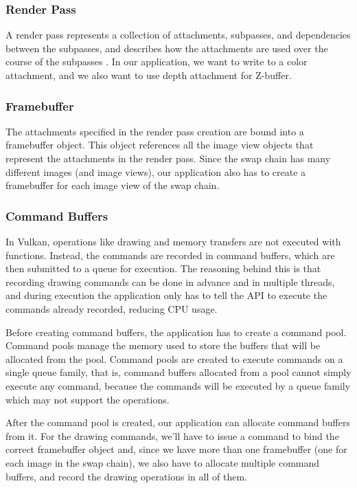\subsubsection{Render Pass}
A render pass represents a collection of attachments, subpasses, and dependencies between the subpasses, and describes how the attachments are used over the course of the subpasses \cite{vulkan_docs}. In our application, we want to write to a color attachment, and we also want to use depth attachment for Z-buffer.

\subsubsection{Framebuffer}
The attachments specified in the render pass creation are bound into a framebuffer object. This object references all the image view objects that represent the attachments in the render pass. Since the swap chain has many different images (and image views), our application also has to create a framebuffer for each image view of the swap chain.

\subsubsection{Command Buffers}
In Vulkan, operations like drawing and memory transfers are not executed with functions. Instead, the commands are recorded in command buffers, which are then submitted to a queue for execution. The reasoning behind this is that recording drawing commands can be done in advance and in multiple threads, and during execution the application only has to tell the API to execute the commands already recorded, reducing CPU usage.

Before creating command buffers, the application has to create a command pool. Command pools manage the memory used to store the buffers that will be allocated from the pool. Command pools are created to execute commands on a single queue family, that is, command buffers allocated from a pool cannot simply execute any command, because the commands will be executed by a queue family which may not support the operations.

After the command pool is created, our application can allocate command buffers from it. For the drawing commands, we'll have to issue a command to bind the correct framebuffer object and, since we have more than one framebuffer (one for each image in the swap chain), we also have to allocate multiple command buffers, and record the drawing operations in all of them.

